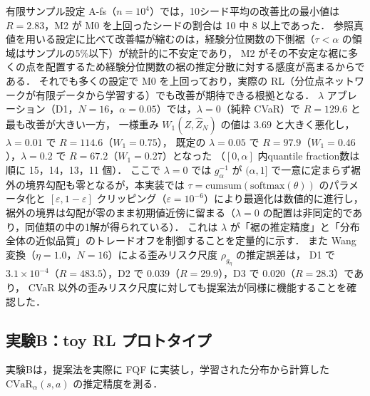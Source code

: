\documentclass[a4paper,10pt]{jsarticle}
\theoremstyle{definition}
\newcommand{\CVaR}{\mathrm{CVaR}}
\newcommand{\Wone}{W_1}
\begin{document}
有限サンプル設定 A-fs（$n=10^4$）では，10シード平均の改善比の最小値は $R=2.83$，M2 が M0 を上回ったシードの割合は 10 中 8 以上であった．
参照真値を用いる設定に比べて改善幅が縮むのは，経験分位関数の下側裾（$\tau<\alpha$ の領域はサンプルの5\%以下）が統計的に不安定であり，
M2 がその不安定な裾に多くの点を配置するため経験分位関数の裾の推定分散に対する感度が高まるからである．
それでも多くの設定で M0 を上回っており，実際の RL（分位点ネットワークが有限データから学習する）でも改善が期待できる根拠となる．
$\lambda$ アブレーション（D1，$N=16$，$\alpha=0.05$）では，$\lambda=0$（純粋 CVaR）で $R=129.6$ と最も改善が大きい一方，
一様重み $\Wone(Z,\hat Z_N)$ の値は $3.69$ と大きく悪化し，$\lambda=0.01$ で $R=114.6$（$\Wone=0.75$），
既定の $\lambda=0.05$ で $R=97.9$（$\Wone=0.46$），$\lambda=0.2$ で $R=67.2$（$\Wone=0.27$）となった
（$[0,\alpha]$ 内quantile fraction数は順に 15，14，13，11 個）．
ここで $\lambda=0$ では $g_\alpha^{-1}$ が $(\alpha,1]$ で一意に定まらず裾外の境界勾配も零となるが，本実装では $\tau=\mathrm{cumsum}(\mathrm{softmax}(\theta))$ のパラメータ化と $[\varepsilon,1-\varepsilon]$ クリッピング（$\varepsilon=10^{-6}$）により最適化は数値的に進行し，裾外の境界は勾配が零のまま初期値近傍に留まる（$\lambda=0$ の配置は非同定的であり，同値類の中の1解が得られている）．
これは $\lambda$ が「裾の推定精度」と「分布全体の近似品質」のトレードオフを制御することを定量的に示す．
また Wang 変換（$\eta=1.0$，$N=16$）による歪みリスク尺度 $\rho_{g_\eta}$ の推定誤差は，
D1 で $3.1\times10^{-4}$（$R=483.5$），D2 で $0.039$（$R=29.9$），D3 で $0.020$（$R=28.3$）であり，
CVaR 以外の歪みリスク尺度に対しても提案法が同様に機能することを確認した．

\subsection{実験B：toy RL プロトタイプ}
\label{subsec:expB}
実験Bは，提案法を実際に FQF に実装し，学習された分布から計算した $\CVaR_\alpha(s,a)$ の推定精度を測る．
\end{document}
